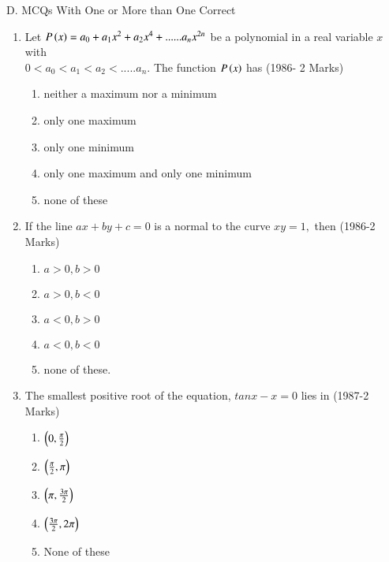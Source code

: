 \documentclass[journal,12pt,twocolumn]{IEEEtran}
\theoremstyle{remark}
\begin{document}
    D. MCQs With One or More than One Correct
 \begin{enumerate}
     \item 
	     Let $P\left(x\right) = a_0+ a_1x^2+a_2x^4+......a_nx^{2n}$ be a polynomial in a real variable $x$ with \\
		 $0<a_0<a_1<a_2<.....a_n.$ The function $P\left(x\right)$ has 
	 \hfill(1986- 2 Marks)
      \begin{enumerate}

         \item neither a maximum nor a minimum
 
         \item only one maximum

         \item only one minimum

         \item only one maximum and only one minimum
   
         \item none of these\\

      \end{enumerate} 

      \item
       If the line $ax+by+c = 0$ is a normal to the curve $xy=1,$ then 
	 \hfill(1986-2 Marks)
        \begin{enumerate}
         \item $a>0,b>0$ 
         \item $a>0,b<0$ 
         \item $a<0,b>0$
         \item $a<0,b<0$
         \item none of these.
       \end{enumerate}

      \item 
      The smallest positive root of the equation, $tanx-x=0$ lies in 
	\hfill(1987-2 Marks)
      \begin{enumerate}
       \item $\left(0,\frac{\pi}{2}\right)$
       \item $\left(\frac{\pi}{2},\pi\right)$
       \item $\left(\pi,\frac{3\pi}{2}\right)$
       \item $\left(\frac{3\pi}{2},2\pi\right)$
       \item None of these\\
      \end{enumerate}


\end{enumerate}
\end{document}
